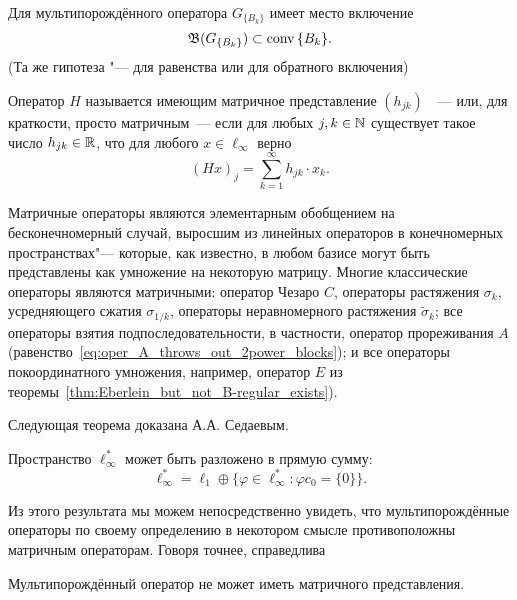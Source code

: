 \begin{hypothesis}
	Для мультипорождённого оператора $G_{\{B_k\}}$ имеет место включение
	\begin{equation}
		\mathfrak{B} (G_{\{B_k\}}) \subset \operatorname{conv} {\{B_k\}}
		.
	\end{equation}
	(Та же гипотеза "--- для равенства или для обратного включения)
\end{hypothesis}

\begin{definition}
	Оператор $H$ называется имеющим матричное представление $(h_{jk})$~~--- или, для краткости,
	просто матричным~--- если для любых $j,k\in \mathbb{N}$ существует такое число $h_{jk}\in\mathbb{R}$,
	что для любого $x\in\ell_\infty$ верно
	\begin{equation}
		(Hx)_j = \sum_{k=1}^{\infty} h_{jk}\cdot x_k
		.
	\end{equation}
\end{definition}

Матричные операторы являются элементарным обобщением на бесконечномерный случай,
выросшим из линейных операторов в конечномерных пространствах"---
которые, как известно, в любом базисе могут быть представлены как умножение на некоторую матрицу.
Многие классические операторы являются матричными:
оператор Чезаро $C$, операторы растяжения $\sigma_k$, усредняющего сжатия $\sigma_{1/k}$,
операторы неравномерного растяжения $\tilde\sigma_k$;
все операторы взятия подпоследовательности, в частности,
оператор прореживания $A$ (равенство~\eqref{eq:oper_A_throws_out_2power_blocks});
и все операторы покоординатного умножения, например, оператор $E$ из теоремы~\ref{thm:Eberlein_but_not_B-regular_exists}).

Следующая теорема доказана А.А. Седаевым.

\begin{theorem}
	Пространство $\ell_\infty^*$ может быть разложено в прямую сумму:
	\begin{equation}
		\ell_\infty^* = \ell_1 \oplus \{\varphi \in\ell_\infty^* : \varphi c_0 = \{0\}\}
		.
	\end{equation}
\end{theorem}

Из этого результата мы можем непосредственно увидеть, что мультипорождённые операторы по своему определению в некотором смысле противоположны матричным операторам. Говоря точнее, справедлива

\begin{theorem}
	Мультипорождённый оператор не может иметь матричного представления.
\end{theorem}


